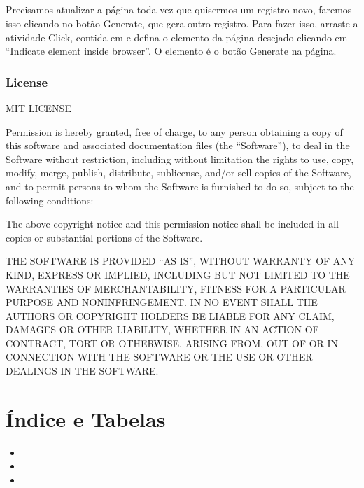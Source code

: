 \documentclass[letterpaper,10pt,brazil]{sphinxmanual}
\begin{document}
\paragraph{}
\label{\detokenize{exercise_2:xxiii-configurar-pagina-para-atualizar}}
Precisamos atualizar a página toda vez que quisermos um registro novo, faremos isso clicando no botão Generate, que gera outro registro. Para fazer isso, arraste a atividade Click, contida em  e defina o elemento da página desejado clicando em “Indicate element inside browser”. O elemento é o botão Generate na página.

\begin{figure}[htbp]
\centering

\noindent{}
\end{figure}


\subsection{License}
\label{\detokenize{license:license}}\label{\detokenize{license::doc}}
MIT LICENSE

Permission is hereby granted, free of charge, to any person obtaining a copy of this software and associated documentation files (the “Software”), to deal in the Software without restriction, including without limitation the rights to use, copy, modify, merge, publish, distribute, sublicense, and/or sell copies of the Software, and to permit persons to whom the Software is furnished to do so, subject to the following conditions:

The above copyright notice and this permission notice shall be included in all copies or substantial portions of the Software.

THE SOFTWARE IS PROVIDED “AS IS”, WITHOUT WARRANTY OF ANY KIND, EXPRESS OR IMPLIED, INCLUDING BUT NOT LIMITED TO THE WARRANTIES OF MERCHANTABILITY, FITNESS FOR A PARTICULAR PURPOSE AND NONINFRINGEMENT. IN NO EVENT SHALL THE AUTHORS OR COPYRIGHT HOLDERS BE LIABLE FOR ANY CLAIM, DAMAGES OR OTHER LIABILITY, WHETHER IN AN ACTION OF CONTRACT, TORT OR OTHERWISE, ARISING FROM, OUT OF OR IN CONNECTION WITH THE SOFTWARE OR THE USE OR OTHER DEALINGS IN THE SOFTWARE.


\chapter{Índice e Tabelas}
\label{\detokenize{index:indice-e-tabelas}}\begin{itemize}
\item {} 

\item {} 

\item {} 

\end{itemize}



\renewcommand{\indexname}{Índice}
\printindex
\end{document}
